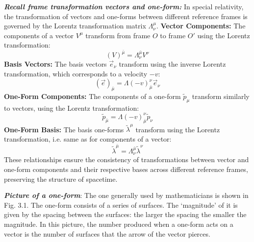 \documentclass[12pt]{book}
\begin{document}
    \textbf{\textit{Recall frame transformation vectors and one-form:}} In special relativity, the transformation of vectors and one-forms between different reference frames is governed by the Lorentz transformation matrix \(\Lambda^\mu_\nu\).
    \textbf{Vector Components:}
    The components of a vector \(V^\mu\) transform from frame \(O\) to frame \(O'\) using the Lorentz transformation:
    \[
    (V)^\bar{\mu} = \Lambda^\bar{\mu}_\nu V^\nu
    \]
    \textbf{Basis Vectors:}
    The basis vectors \(\vec{e}_\nu\) transform using the inverse Lorentz transformation, which corresponds to a velocity \(-v\):
    \[
    (\vec{e})_\bar{\mu} = \Lambda(-v)^\nu_\bar{\mu} \vec{e}_\nu
    \]
    \textbf{One-Form Components:}
    The components of a one-form \(\tilde{p}_\mu\) transform similarly to vectors, using the Lorentz transformation:
    \[
    \tilde{p}_\bar{\mu} = \Lambda(-v)_\bar{\mu}^\nu \tilde{p}_\nu
    \]
    \textbf{One-Form Basis:}
    The basis one-forms \(\tilde{\lambda}^\mu\) transform using the Lorentz transformation, i.e. same as for components of a vector:
    \[
    \tilde{\lambda}^\bar{\mu} = \Lambda^\bar{\mu}_\nu \tilde{\lambda}^\nu
    \]
    These relationships ensure the consistency of transformations between vector and one-form components and their respective bases across different reference frames, preserving the structure of spacetime.
    
    \textit{\textbf{Picture of a one-form}}: The one generally used by mathematicians is shown in Fig. 3.1. The one-form consists of a series of surfaces. The ‘magnitude’ of it is given by the spacing between the surfaces: the larger the spacing the smaller the magnitude. In this picture, the number produced when a one-form acts on a vector is the number of surfaces that the arrow of the vector pierces.
\end{document}
